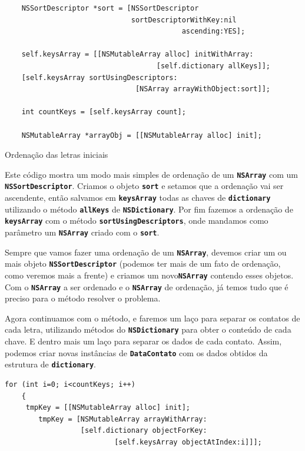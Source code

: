 \documentclass[a4paper,12pt,brazil,doubleside]{book}
\begin{document}
\begin{singlespace}
\begin{listing}[H]
\begin{verbatim}
    NSSortDescriptor *sort = [NSSortDescriptor
                              sortDescriptorWithKey:nil
                                          ascending:YES];
    
    self.keysArray = [[NSMutableArray alloc] initWithArray:
                                    [self.dictionary allKeys]];
    [self.keysArray sortUsingDescriptors:
                               [NSArray arrayWithObject:sort]];
    
    int countKeys = [self.keysArray count];

    NSMutableArray *arrayObj = [[NSMutableArray alloc] init];
\end{verbatim}
\caption{Ordenação das letras iniciais}
\end{listing}


Este código mostra um modo mais simples de ordenação de um \texttt{\textbf{NSArray}} 
com um \texttt{\textbf{NSSortDescriptor}}. Criamos o objeto \texttt{\textbf{sort}} e setamos que a ordenação vai ser ascendente, então salvamos em \texttt{\textbf{keysArray}} todas as chaves de \texttt{\textbf{dictionary}} utilizando o método \texttt{\textbf{allKeys}} de \texttt{\textbf{NSDictionary}}. Por fim fazemos a ordenação de \texttt{\textbf{keysArray}} com o método \texttt{\textbf{sortUsingDescriptors}}, onde mandamos como parâmetro um \texttt{\textbf{NSArray}} criado com o \texttt{\textbf{sort}}.

Sempre que vamos fazer uma ordenação de um \texttt{\textbf{NSArray}}, devemos criar um ou mais objeto \texttt{\textbf{NSSortDescriptor}} (podemos ter mais de um fato de ordenação, como veremos mais a frente) e criamos um novo\texttt{\textbf{NSArray}} contendo esses objetos. Com o \texttt{\textbf{NSArray}} a ser ordenado e o \texttt{\textbf{NSArray}} de ordenação, já temos tudo que é preciso para o método resolver o problema.

Agora continuamos com o método, e faremos um laço para separar os contatos de cada letra, utilizando métodos do \texttt{\textbf{NSDictionary}} para obter o conteúdo de cada chave. E dentro mais um laço para separar os dados de cada contato. Assim, podemos criar novas instâncias de \texttt{\textbf{DataContato}} com os dados obtidos da estrutura de \texttt{\textbf{dictionary}}.

\begin{listing}[H]
\begin{verbatim}
for (int i=0; i<countKeys; i++)
    {
	 tmpKey = [[NSMutableArray alloc] init];
        tmpKey = [NSMutableArray arrayWithArray:
                  [self.dictionary objectForKey:
                          [self.keysArray objectAtIndex:i]]];
        

\end{verbatim}
\end{listing}
\end{singlespace}
\end{document}
